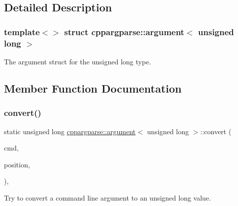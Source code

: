 \subsection{Detailed Description}
\subsubsection*{template$<$$>$\newline
struct cppargparse\+::argument$<$ unsigned long $>$}

The argument struct for the unsigned long type. 

\subsection{Member Function Documentation}
\mbox{\label{structcppargparse_1_1argument_3_01unsigned_01long_01_4_a3beb14e05f31f1afc474a0288d16f9e7}} 
\subsubsection{\texorpdfstring{convert()}{convert()}}
{\footnotesize\ttfamily static unsigned long \hyperlink{structcppargparse_1_1argument}{cppargparse\+::argument}$<$ unsigned long $>$\+::convert (\begin{DoxyParamCaption}\item[{const \hyperlink{types_8h_a80adf2418b7ce9fe616698efa7533ecf}{types\+::\+Command\+Line\+\_\+t} \&}]{cmd,  }\item[{const \hyperlink{types_8h_a43b4f43f8940de1bf09ced6f1b668053}{types\+::\+Command\+Line\+Position\+\_\+t} \&}]{position,  }\item[{const \hyperlink{types_8h_a003c660afe2ee9c6cc39aea966e8926d}{types\+::\+Command\+Line\+Arguments\+\_\+t} \&}]{ }\end{DoxyParamCaption})\hspace{0.3cm}{\ttfamily [inline]}, {\ttfamily [static]}}



Try to convert a command line argument to an unsigned long value. 


